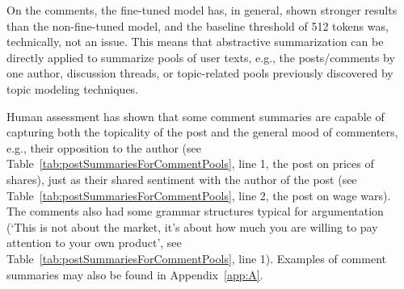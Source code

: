 On the comments, the fine-tuned model has, in general, shown stronger results than the non-fine-tuned model, and the baseline threshold of 512 tokens was, technically, not an issue. This means that abstractive summarization can be directly applied to summarize pools of user texts, e.g., the posts/comments by one author, discussion threads, or topic-related pools previously discovered by topic modeling techniques.

Human assessment has shown that some comment summaries are capable of capturing both the topicality of the post and the general mood of commenters, e.g., their opposition to the author (see Table~\cref{tab:postSummariesForCommentPools}, line 1, the post on prices of shares), just as their shared sentiment with the author of the post (see Table~\cref{tab:postSummariesForCommentPools}, line 2, the post on wage wars). The comments also had some grammar structures typical for argumentation (‘This is not about the market, it’s about how much you are willing to pay attention to your own product’, see Table~\cref{tab:postSummariesForCommentPools}, line 1). Examples of comment summaries may also be found in Appendix~\cref{app:A}.

